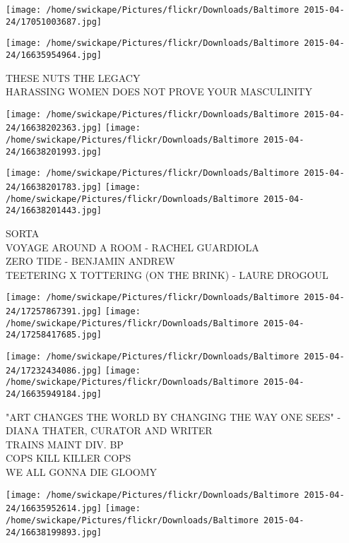 \documentclass[10pt,letterpaper]{article}
\begin{document}
\texttt{[image: /home/swickape/Pictures/flickr/Downloads/Baltimore 2015-04-24/17051003687.jpg]}

\vspace{0.25in}
\texttt{[image: /home/swickape/Pictures/flickr/Downloads/Baltimore 2015-04-24/16635954964.jpg]}

THESE NUTS THE LEGACY\\
HARASSING WOMEN DOES NOT PROVE YOUR MASCULINITY\\
\pagebreak

\texttt{[image: /home/swickape/Pictures/flickr/Downloads/Baltimore 2015-04-24/16638202363.jpg]}
\texttt{[image: /home/swickape/Pictures/flickr/Downloads/Baltimore 2015-04-24/16638201993.jpg]}

\texttt{[image: /home/swickape/Pictures/flickr/Downloads/Baltimore 2015-04-24/16638201783.jpg]}
\texttt{[image: /home/swickape/Pictures/flickr/Downloads/Baltimore 2015-04-24/16638201443.jpg]}

SORTA\\
VOYAGE AROUND A ROOM {-} RACHEL GUARDIOLA\\
ZERO TIDE {-} BENJAMIN ANDREW\\
TEETERING X TOTTERING (ON THE BRINK) {-} LAURE DROGOUL\\
\pagebreak

\texttt{[image: /home/swickape/Pictures/flickr/Downloads/Baltimore 2015-04-24/17257867391.jpg]}
\texttt{[image: /home/swickape/Pictures/flickr/Downloads/Baltimore 2015-04-24/17258417685.jpg]}

\texttt{[image: /home/swickape/Pictures/flickr/Downloads/Baltimore 2015-04-24/17232434086.jpg]}
\texttt{[image: /home/swickape/Pictures/flickr/Downloads/Baltimore 2015-04-24/16635949184.jpg]}

"ART CHANGES THE WORLD BY CHANGING THE WAY ONE SEES" {-} DIANA THATER, CURATOR AND WRITER\\
TRAINS MAINT DIV. BP\\
COPS KILL KILLER COPS\\
WE ALL GONNA DIE GLOOMY\\
\pagebreak

\texttt{[image: /home/swickape/Pictures/flickr/Downloads/Baltimore 2015-04-24/16635952614.jpg]}
\texttt{[image: /home/swickape/Pictures/flickr/Downloads/Baltimore 2015-04-24/16638199893.jpg]}
\end{document}
